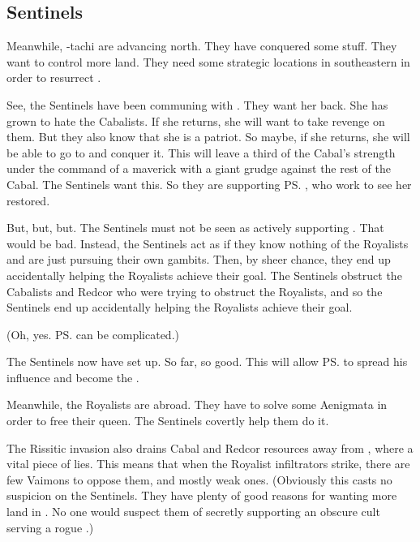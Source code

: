 \begin{garbage}
\subsection{Sentinels}
Meanwhile, \Narkiza-tachi are advancing north. 
They have conquered some stuff. 
They want to control more land. 
They need some strategic locations in southeastern \Velcad{} in order to resurrect \Belzir. 

See, the Sentinels have been communing with \Belzir. 
They want her back. 
She has grown to hate the Cabalists.
If she returns, she will want to take revenge on them. 
But they also know that she is a \Mystraacht{} patriot. 
So maybe, if she returns, she will be able to go to \Mystraacht{} and conquer it. 
This will leave a third of the Cabal's strength under the command of a maverick with a giant grudge against the rest of the Cabal. 
The Sentinels want this. 
So they are supporting \ps{\Belzir} , who work to see her restored. 

But, but, but. 
The Sentinels must not be seen as actively supporting \Belzir.
That would be bad. 
Instead, the Sentinels act as if they know nothing of the Royalists and are just pursuing their own gambits.
Then, by sheer chance, they  end up accidentally helping the Royalists achieve their goal. 
The Sentinels obstruct the Cabalists and Redcor who were trying to obstruct the Royalists, and so the Sentinels  end up accidentally helping the Royalists achieve their goal. 

(Oh, yes. 
\ps{\Secherdamon}  can be complicated.) 

The Sentinels now have \Nithdornazsh{} set up. 
So far, so good. 
This will allow \ps{\Vizsherioch} to spread his \vertex{} influence and become the . 

Meanwhile, the Royalists are abroad. 
They have to solve some Aenigmata in order to free their queen. 
The Sentinels covertly help them do it. 

The Rissitic invasion also drains Cabal and Redcor resources away from \Redce, where a vital piece of \Belzir{} lies. 
This means that when the \Redcean{} Royalist infiltrators strike, there are few Vaimons to oppose them, and mostly weak ones. 
(Obviously this casts no suspicion on the Sentinels. 
 They have plenty of good reasons for wanting more land in \Velcad.
 No one would suspect them of secretly supporting an obscure cult serving a rogue \resphan.) 






\end{garbage}
